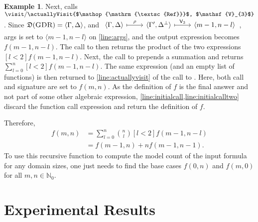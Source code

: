 \documentclass{article}
\theoremstyle{definition}
\newtheorem{example}{Example}
\theoremstyle{remark}
\newcommand{\Vone}{\mathsf{V}_{1}}
\newcommand{\Vthree}{\mathsf{V}_{3}}
\DeclareMathOperator{\GDR}{\textsc{GDR}}
\DeclareMathOperator{\Reff}{\textsc{Ref}}
\begin{document}
\begin{example}
  Next, \actuallyVisit{$\land$, $\Vthree$} calls
  $\visit/\actuallyVisit{$\Reff$, $\Vthree$}$. Since
  $\mathfrak{D}(\GDR) = \langle \Gamma, \Delta \rangle$, and
  $\begin{tikzcd} \langle\Gamma, \Delta\rangle \ar[r, mapsto, "\rho"] & \langle\Gamma', \Delta^{\bot}\rangle \ar[r, mapsto, "\Vthree"] & \langle m-1, n-l \rangle\end{tikzcd}$,
  \textsf{args} is set to $\langle m-1, n-l \rangle$ on \cref{line:args}, and
  the output expression becomes $f(m-1, n-l)$. The call to
  \actuallyVisit{$\land$, $\Vthree$} then returns the product of the two
  expressions $[l<2]f(m-1, n-l)$. Next, the call to \actuallyVisit{$\bigvee$,
    $\Vone$} prepends a summation and returns $\sum_{l=0}^{n}[l<2]f(m-1,n-l)$.
  The same expression (and an empty list of functions) is then returned to
  \cref{line:actuallyvisit} of the call to \visit{$\GDR$, $\Vone$}. Here, both
  \textsf{call} and \textsf{signature} are set to $f(m, n)$. As the definition
  of $f$ is the final answer and not part of some other algebraic expression,
  \cref{line:initialcall,line:initialcalltwo} discard the function call
  expression and return the definition of $f$.

  Therefore,
  \begin{align}
    f(m, n) &= \sum_{l = 0}^{n} \binom{n}{l} [l < 2] f(m-1, n-l)\nonumber \\
            &= f(m-1, n) + n f(m-1, n-1).\label{eq:solution}
  \end{align}
  To use this recursive function to compute the model count of the input formula
  for any domain sizes, one just needs to find the base cases $f(0, n)$ and
  $f(m, 0)$ for all $m, n \in \mathbb{N}_{0}$.
\end{example}

\section{Experimental Results}\label{sec:results}
\end{document}
